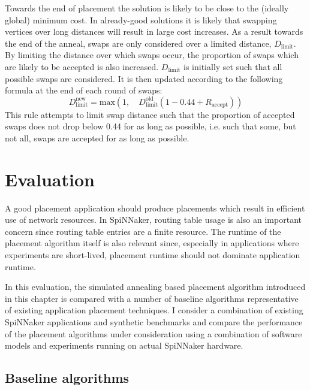 				Towards the end of placement the solution is likely to be close to the
				(ideally global) minimum cost. In already-good solutions it is likely
				that swapping vertices over long distances will result in large cost
				increases. As a result towards the end of the anneal, swaps are only
				considered over a limited distance, $D_\textrm{limit}$. By limiting the
				distance over which swaps occur, the proportion of swaps which are
				likely to be accepted is also increased. $D_\textrm{limit}$ is
				initially set such that all possible swaps are considered. It is then
				updated according to the following formula at the end of each round of
				swaps:
				\[
					D_\textrm{limit}^\textrm{new} =
						\textrm{max}(1,\quad D_\textrm{limit}^\textrm{old}(1-0.44 + R_\textrm{accept}))
				\]
				This rule attempts to limit swap distance such that the proportion of
				accepted swaps does not drop below 0.44 for as long as possible, i.e.
				such that some, but not all, swaps are accepted for as long as
				possible.
	
	\section{Evaluation}
		
		\label{sec:placement-results}
		
		A good placement application should produce placements which result in
		efficient use of network resources. In SpiNNaker, routing table usage is
		also an important concern since routing table entries are a finite
		resource. The runtime of the placement algorithm itself is also
		relevant since, especially in applications where experiments are
		short-lived, placement runtime should not dominate application runtime.
		
		In this evaluation, the simulated annealing based placement algorithm
		introduced in this chapter is compared with a number of baseline algorithms
		representative of existing application placement techniques. I consider a
		combination of existing SpiNNaker applications and synthetic benchmarks and
		compare the performance of the placement algorithms under consideration
		using a combination of software models and experiments running on actual
		SpiNNaker hardware.
		
		\subsection{Baseline algorithms}
			
